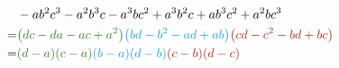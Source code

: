 \documentclass[main.tex]{subfiles}
\begin{document}
\begin{align*}
     & - a b^2 c^3 - a^2 b^3 c - a^3 b c^2 + a^3 b^2 c + a b^3 c^2 + a^2 b c^3 \\
    =& \textcolor{OliveGreen}{\left( dc -da -ac +a^2 \right)} 
    \textcolor{Cerulean}{\left( bd -b^2 -ad +ab \right)} 
    \textcolor{BrickRed}{\left( cd - c^2 -bd +bc \right)} 
    \\
    =& \textcolor{OliveGreen}{(d-a)(c-a)}
    \textcolor{Cerulean}{(b-a)(d-b)}
    \textcolor{BrickRed}{(c-b)(d-c)} \\
\end{align*}
\end{document}
